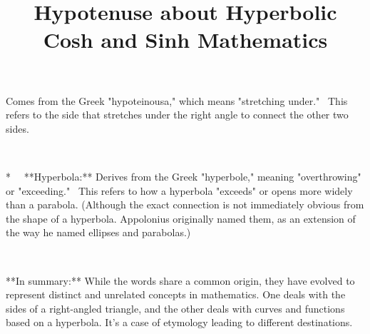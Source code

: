 \documentclass{article}
\begin{document}
{Comes from the Greek "hypoteinousa," which means "stretching under." \ This
refers to the side that stretches under the right angle to connect the other
two sides.

\

* \ \ **Hyperbola:** Derives from the Greek "hyperbole," meaning
"overthrowing" or "exceeding." \ This refers to how a hyperbola "exceeds" or
opens more widely than a parabola. (Although the exact connection is not
immediately obvious from the shape of a hyperbola. Appolonius originally named
them, as an extension of the way he named ellipses and parabolas.)

\

**In summary:** While the words share a common origin, they have evolved to
represent distinct and unrelated concepts in mathematics. One deals with the
sides of a right-angled triangle, and the other deals with curves and
functions based on a hyperbola. It's a case of etymology leading to different
destinations.

\ }

\title{Hypotenuse about Hyperbolic Cosh and Sinh Mathematics}

\maketitle
\end{document}
